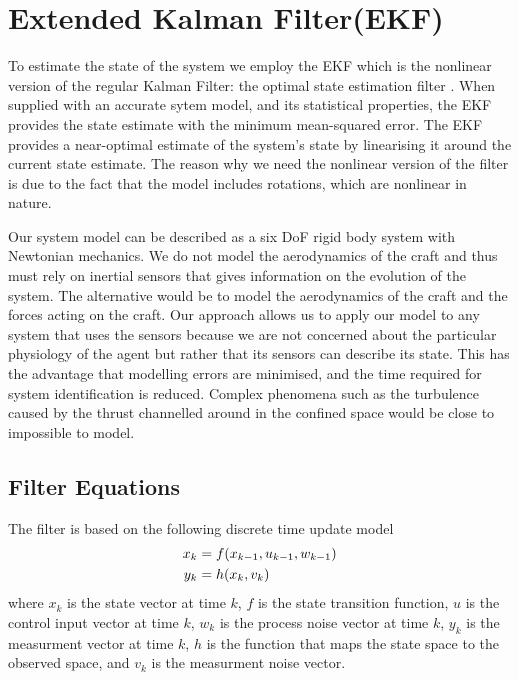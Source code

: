 \documentclass[]{article}
\begin{document}
{%

\clearpage %
\section{Extended Kalman Filter\ac{(EKF)}} %
\label{sec:ekf}

To estimate the state of the system we employ the \ac{EKF} which is the nonlinear version of the regular Kalman Filter: the optimal state estimation filter \cite{todo}. When supplied with an accurate sytem model, and its statistical properties, the EKF provides the state estimate with the minimum mean-squared error.
The \ac{EKF} provides a near-optimal estimate of the system's state by linearising it around the current state estimate. The reason why we need the nonlinear version of the filter is due to the fact that the model includes rotations, which are nonlinear in nature.


Our system model can be described as a six \ac{DoF} rigid body system with Newtonian mechanics. We do not model the aerodynamics of the craft and thus must rely on inertial sensors that gives information on the evolution of the system\cite{OpenPilotPaper}. The alternative would be to model the aerodynamics of the craft and the forces acting on the craft. Our approach allows us to apply our model to any system that uses the sensors because we are not concerned about the particular physiology of the agent but rather that its sensors can describe its state.
This has the advantage that modelling errors are minimised, and the time required for system identification is reduced.
Complex phenomena such as the turbulence caused by the thrust channelled around in the confined space would be close to impossible to model.

\subsection{Filter Equations} %
\label{sub:filter_equations}

The filter is based on the following discrete time update model
\begin{align}
	x_k &= f(x_{k-1}, u_{k-1}, w_{k-1}) \notag \\
	y_k &= h(x_k, v_k)
	\label{eqn:system}
\end{align}
where $x_k$ is the state vector at time $k$, $f$ is the state transition function, $u$ is the control input vector at time $k$, $w_k$ is the process noise vector at time $k$, $y_k$ is the measurment vector at time $k$, $h$ is the function that maps the state space to the observed space, and $v_k$ is the measurment noise vector.

}
\end{document}

